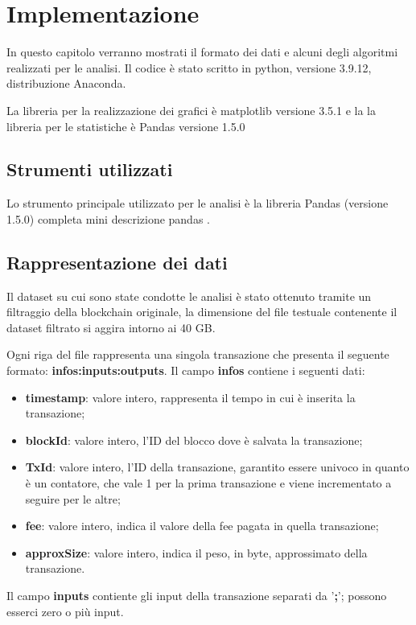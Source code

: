 \chapter{Implementazione}
In questo capitolo verranno mostrati il formato dei dati e alcuni degli algoritmi realizzati per le analisi.
Il codice è stato scritto in python, versione 3.9.12, distribuzione Anaconda.

La libreria per la realizzazione dei grafici è matplotlib versione 3.5.1 e la la libreria per le statistiche è Pandas versione 1.5.0
\section{Strumenti utilizzati}
Lo strumento principale utilizzato per le analisi è la libreria Pandas (versione 1.5.0)
 completa mini descrizione pandas
\cite{pandas}. 
\section{Rappresentazione dei dati}
Il dataset su cui sono state condotte le analisi è stato ottenuto tramite un filtraggio della blockchain originale, la dimensione del file testuale contenente il dataset filtrato si aggira intorno ai 40 GB.

Ogni riga del file rappresenta una singola transazione che presenta il seguente formato:
\textbf{infos:inputs:outputs}.
Il campo \textbf{infos} contiene i seguenti dati:
\begin{itemize}
    \item \textbf{timestamp}: valore intero, rappresenta il tempo in cui è inserita la transazione;
    \item \textbf{blockId}: valore intero, l'ID del blocco dove è salvata la transazione;
    \item \textbf{TxId}: valore intero, l'ID della transazione, garantito essere univoco in quanto è un contatore, che vale 1 per la prima transazione e viene incrementato a seguire per le altre;
    \item \textbf{fee}: valore intero, indica il valore della fee pagata in quella transazione;
    \item \textbf{approxSize}: valore intero, indica il peso, in byte, approssimato della transazione.
\end{itemize}
Il campo \textbf{inputs} contiente gli input della transazione separati da '\textbf{;}'; possono esserci zero o più input.

